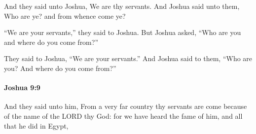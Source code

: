 			\begin{versebox}
					\item[BHS] 
					\item[ASV] And they said unto Joshua, We are thy servants. And Joshua said unto them, Who are ye? and from whence come ye?
					\item[NIV] “We are your servants,” they said to Joshua. But Joshua asked, “Who are you and where do you come from?”
					\item[NRSV] They said to Joshua, “We are your servants.” And Joshua said to them, “Who are you? And where do you come from?”
			\end{versebox}

		\paragraph{Joshua 9:9} %
			\label{JOSHUA-9-9}

			And they said unto him, From a very far country thy servants are come because of the name of the LORD thy God: for we have heard the fame of him, and all that he did in Egypt,

